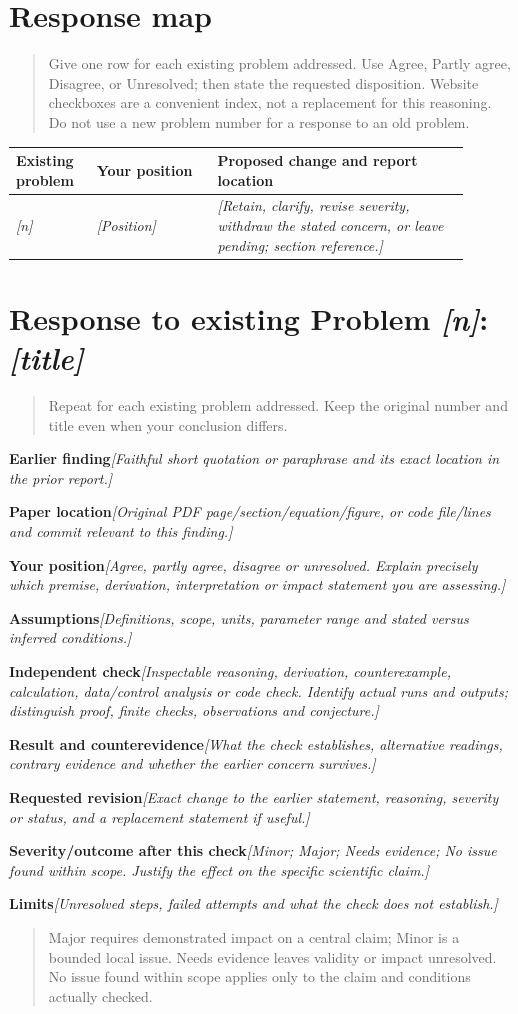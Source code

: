 \documentclass[11pt]{article}
\newcommand{\prompt}[1]{\textit{\textcolor{promptink}{[#1]}}}
\newcommand{\entry}[2]{\textbf{#1}\quad\prompt{#2}\par}
\newcommand{\guidance}[1]{\begin{quote}\small #1\end{quote}}
\begin{document}
\section{Response map}
\guidance{Give one row for each existing problem addressed. Use Agree,
Partly agree, Disagree, or Unresolved; then state the requested disposition.
Website checkboxes are a convenient index, not a replacement for this reasoning.
Do not use a new problem number for a response to an old problem.}
\begin{tabular}{@{}>{\raggedright\arraybackslash}p{0.16\linewidth}>{\raggedright\arraybackslash}p{0.24\linewidth}>{\raggedright\arraybackslash}p{0.50\linewidth}@{}}
\toprule
Existing problem & Your position & Proposed change and report location\\
\midrule
\prompt{n} & \prompt{Position} & \prompt{Retain, clarify, revise severity, withdraw
the stated concern, or leave pending; section reference.}\\
\bottomrule
\end{tabular}

\newpage
\section{Response to existing Problem \prompt{n}: \prompt{title}}
\guidance{Repeat for each existing problem addressed. Keep the original number
and title even when your conclusion differs.}
\entry{Earlier finding}{Faithful short quotation or paraphrase and its exact
location in the prior report.}
\entry{Paper location}{Original PDF page/section/equation/figure, or code file/lines
and commit relevant to this finding.}
\entry{Your position}{Agree, partly agree, disagree or unresolved. Explain precisely
which premise, derivation, interpretation or impact statement you are assessing.}
\entry{Assumptions}{Definitions, scope, units, parameter range and stated versus
inferred conditions.}
\entry{Independent check}{Inspectable reasoning, derivation, counterexample,
calculation, data/control analysis or code check. Identify actual runs and outputs;
distinguish proof, finite checks, observations and conjecture.}
\entry{Result and counterevidence}{What the check establishes, alternative readings,
contrary evidence and whether the earlier concern survives.}
\entry{Requested revision}{Exact change to the earlier statement, reasoning,
severity or status, and a replacement statement if useful.}
\entry{Severity/outcome after this check}{Minor; Major; Needs evidence;
No issue found within scope. Justify the effect on the specific scientific claim.}
\entry{Limits}{Unresolved steps, failed attempts and what the check does not establish.}
\guidance{Major requires demonstrated impact on a central claim; Minor is a bounded
local issue. Needs evidence leaves validity or impact unresolved. No issue found
within scope applies only to the claim and conditions actually checked.}
\end{document}
